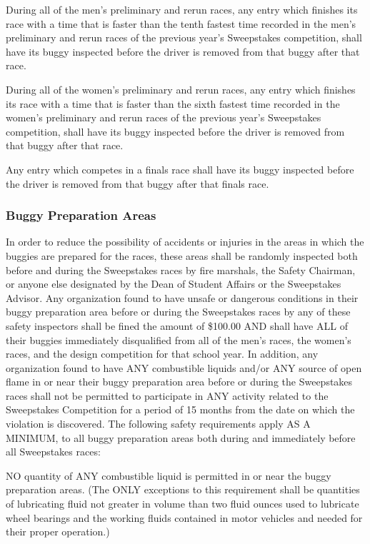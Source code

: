 During all of the men's preliminary and rerun races, any entry which finishes its race with a time that is faster than the tenth fastest time recorded in the men's preliminary and rerun races of the previous year's Sweepstakes competition, shall have its buggy inspected before the driver is removed from that buggy after that race.

During all of the women's preliminary and rerun races, any entry which finishes its race with a time that is faster than the sixth fastest time recorded in the women's preliminary and rerun races of the previous year's Sweepstakes competition, shall have its buggy inspected before the driver is removed from that buggy after that race.

Any entry which competes in a finals race shall have its buggy inspected before the driver is removed from that buggy after that finals race.

\subsubsection{Buggy Preparation Areas}

In order to reduce the possibility of accidents or injuries in the areas in which the buggies are prepared for the races, these areas shall be randomly inspected both before and during the Sweepstakes races by fire marshals, the Safety Chairman, or anyone else designated by the Dean of Student Affairs or the Sweepstakes Advisor. Any organization found to have unsafe or dangerous conditions in their buggy preparation area before or during the Sweepstakes races by any of these safety inspectors shall be fined the amount of \$100.00 AND shall have ALL of their buggies immediately disqualified from all of the men's races, the women's races, and the design competition for that school year. In addition, any organization found to have ANY combustible liquids and/or ANY source of open flame in or near their buggy preparation area before or during the Sweepstakes races shall not be permitted to participate in ANY activity related to the Sweepstakes Competition for a period of 15 months from the date on which the violation is discovered. The following safety requirements apply AS A MINIMUM, to all buggy preparation areas both during and immediately before all Sweepstakes races:

NO quantity of ANY combustible liquid is permitted in or near the buggy preparation areas. (The ONLY exceptions to this requirement shall be quantities of lubricating fluid not greater in volume than two fluid ounces used to lubricate wheel bearings and the working fluids contained in motor vehicles and needed for their proper operation.)

